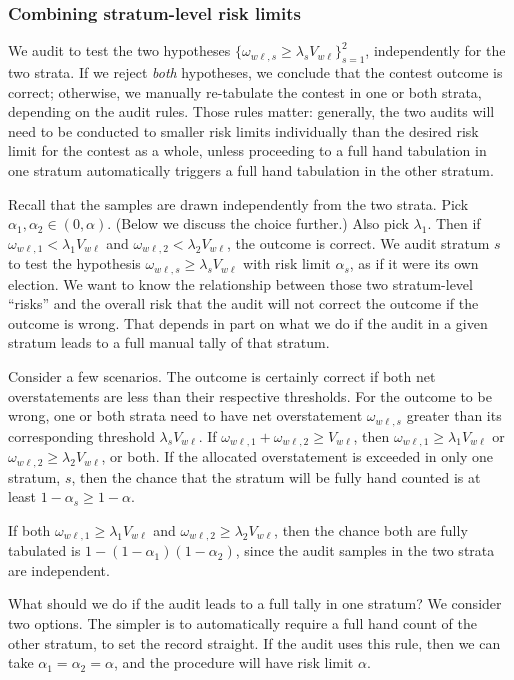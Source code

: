 \subsubsection{Combining stratum-level risk limits}\label{sec:stratumRisk}
We audit to test the two hypotheses $\{\omega_{w\ell,s} \ge \lambda_s V_{w\ell}\}_{s=1}^2$, 
independently for the two strata.
If we reject \emph{both} hypotheses, we conclude that the contest outcome is correct;
otherwise, we manually re-tabulate the contest in one or both strata, depending on the
audit rules.
Those rules matter:
generally, the two audits will need to be conducted to smaller risk limits individually than the desired
risk limit for the contest as a whole, unless proceeding to a full hand tabulation in one stratum
automatically triggers a full hand tabulation in the other stratum.

Recall that the samples are drawn independently from the two strata.
Pick $\alpha_1, \alpha_2 \in (0,\alpha)$.
(Below we discuss the choice further.)
Also pick $\lambda_1$.
Then if $\omega_{w\ell,1} < \lambda_1 V_{w\ell}$ and 
$\omega_{w\ell,2} < \lambda_2 V_{w\ell}$,
the outcome is correct.
We audit stratum $s$ to test the hypothesis $\omega_{w\ell,s} \ge \lambda_s V_{w\ell}$ 
with risk limit $\alpha_s$,
as if it were its own election.
We want to know the relationship between those two stratum-level ``risks'' and the 
overall risk that the audit will not correct the outcome if the outcome is wrong.
That depends in part on what we do if the audit in a given stratum leads to a full manual
tally of that stratum.

Consider a few scenarios.
The outcome is certainly correct if both net overstatements are less than their 
respective thresholds. 
For the outcome to be wrong, one or both strata need to have net overstatement
$\omega_{w\ell,s}$
greater than its corresponding threshold $\lambda_s V_{w\ell}$.
If $\omega_{w\ell,1} + \omega_{w\ell,2} \ge V_{w\ell}$, then $\omega_{w\ell,1}\ge \lambda_1V_{w\ell}$
or $\omega_{w\ell,2}\ge \lambda_2V_{w\ell}$, or both.
If the allocated overstatement is exceeded in only one stratum, $s$, then the chance that the 
stratum will be fully hand counted is at least $1-\alpha_s \ge 1- \alpha$.

If both $\omega_{w\ell,1} \ge \lambda_1V_{w\ell}$
and $\omega_{w\ell,2} \ge \lambda_2V_{w\ell}$, then the chance both are fully tabulated is
$1-(1-\alpha_1)(1-\alpha_2)$, since the audit samples in the two strata are independent.

What should we do if the audit leads to a full tally in one stratum?
We consider two options.
The simpler is to automatically require a full hand count of the other stratum, 
to set the record straight.
If the audit uses this rule, then we can take $\alpha_1 = \alpha_2 = \alpha$, and the procedure will have
risk limit $\alpha$.

